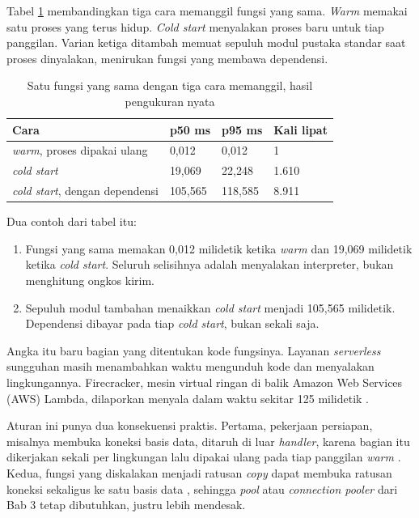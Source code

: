 Tabel \ref{tab:coldstart14} membandingkan tiga cara memanggil fungsi yang
sama. \textit{Warm} memakai satu proses yang terus hidup. \textit{Cold start}
menyalakan proses baru untuk tiap panggilan. Varian ketiga ditambah memuat
sepuluh modul pustaka standar saat proses dinyalakan, menirukan fungsi yang
membawa dependensi.

\begin{table}[!htb]
  \centering
  \caption{Satu fungsi yang sama dengan tiga cara memanggil, hasil
           pengukuran nyata}
  \label{tab:coldstart14}
  \begin{tabularx}{\textwidth}{Xlll}
    \hline
    \textbf{Cara} & \textbf{p50 ms} & \textbf{p95 ms} & \textbf{Kali lipat} \\
    \hline
    \textit{warm}, proses dipakai ulang & 0,012 & 0,012 & 1 \\
    \hline
    \textit{cold start} & 19,069 & 22,248 & 1.610 \\
    \hline
    \textit{cold start}, dengan dependensi & 105,565 & 118,585 & 8.911 \\
    \hline
  \end{tabularx}
\end{table}

Dua contoh dari tabel itu:
\begin{enumerate}
  \item Fungsi yang sama memakan 0,012 milidetik ketika \textit{warm} dan
        19,069 milidetik ketika \textit{cold start}. Seluruh selisihnya adalah
        menyalakan interpreter, bukan menghitung ongkos kirim.
  \item Sepuluh modul tambahan menaikkan \textit{cold start} menjadi 105,565
        milidetik. Dependensi dibayar pada tiap \textit{cold start}, bukan
        sekali saja.
\end{enumerate}

Angka itu baru bagian yang ditentukan kode fungsinya. Layanan
\textit{serverless} sungguhan masih menambahkan waktu mengunduh kode dan
menyalakan lingkungannya. Firecracker, mesin virtual ringan di balik Amazon
Web Services (AWS) Lambda, dilaporkan menyala dalam waktu sekitar 125 milidetik
\cite{agache2020firecracker}.

Aturan ini punya dua konsekuensi praktis. Pertama, pekerjaan persiapan,
misalnya membuka koneksi basis data, ditaruh di luar \textit{handler},
karena bagian itu dikerjakan sekali per lingkungan lalu dipakai ulang pada
tiap panggilan \textit{warm} \cite{aws-lambda-lifecycle}. Kedua, fungsi
yang diskalakan menjadi ratusan \textit{copy} dapat membuka ratusan koneksi
sekaligus ke satu basis data \cite{aws-lambda-concurrency}, sehingga
\textit{pool} atau \textit{connection pooler} dari Bab 3 tetap dibutuhkan,
justru lebih mendesak.

